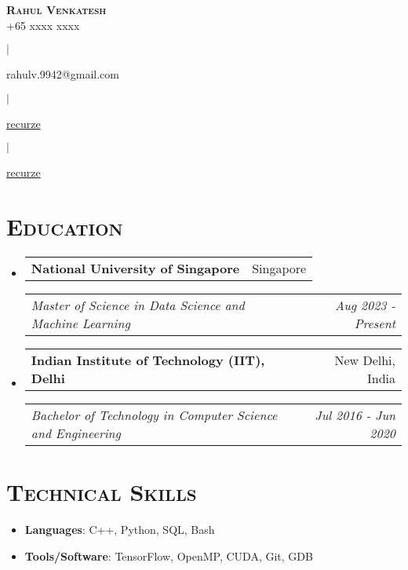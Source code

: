 \documentclass{article}
\makeatletter
\newcommand{\headerrow}[2]
{\begin{tabular*}{\linewidth}{l@{\extracolsep{\fill}}r}
    #1 &
    #2 \\
\end{tabular*}}
\newcommand{\email}[1]{
    \faEnvelope \space #1
}
\newcommand{\phone}[1]{
    \faPhone \space #1
}
\newcommand{\github}[1]{
    \href{https://www.github.com/#1}{\faGithub \space #1}
}
\newcommand{\linkedin}[1]{
    \href{https://www.linkedin.com/in/#1}{\faLinkedin \space #1}
}
\makeatother
\begin{document}
\begin{center}
    {\huge \textsc{\textbf{Rahul Venkatesh}}} \\[2pt]
    \phone{+65 xxxx xxxx}
    $\mid$
    \email{rahulv.9942@gmail.com}
    $\mid$
    \linkedin{recurze}
    $\mid$
    \github{recurze}
\end{center}

\section*{\textsc{\textbf{Education}}}
\begin{itemize}[leftmargin=0em]

\item[]
    \headerrow {\textbf{National University of Singapore}}{Singapore}
    \headerrow {\emph{Master of Science in Data Science and Machine Learning}}{\emph{Aug 2023 - Present}}

\item[]
    \headerrow {\textbf{Indian Institute of Technology (IIT), Delhi}}{New Delhi, India}
    \headerrow {\emph{Bachelor of Technology in Computer Science and Engineering}}{\emph{Jul 2016 - Jun 2020}}

\end{itemize}

%

\section*{\textsc{\textbf{Technical Skills}}}
\begin{itemize}[itemsep=0em, leftmargin=0.7em]
\item[]
    \textbf{Languages}: C++, Python, SQL, Bash
\item[]
    \textbf{Tools/Software}: TensorFlow, OpenMP, CUDA, Git, GDB
\end{itemize}
\end{document}
